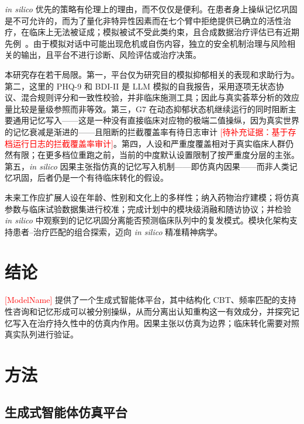 \documentclass[11pt,a4paper]{article}
\newcommand{\ph}[1]{\textcolor{red}{[#1]}}
\begin{document}
\emph{in silico} 优先的策略有伦理上的理由，而不仅仅是便利。在患者身上操纵记忆巩固是不可允许的，而为了量化非特异性因素而在七个臂中拒绝提供已确立的活性治疗，在临床上无法被证成；模拟被试不受此类约束，且合成数据治疗评估已有近期先例~\cite{yosef2025}。由于模拟对话中可能出现危机或自伤内容，独立的安全机制治理与风险相关的输出，且平台不进行诊断、风险评估或治疗决策。

本研究存在若干局限。第一，平台仅为研究目的模拟抑郁相关的表现和求助行为。第二，这里的 PHQ-9 和 BDI-II 是 LLM 模拟的自我报告，采用逐项无状态协议、混合规则评分和一致性校验，并非临床施测工具；因此与真实荟萃分析的效应量比较是量级参照而非等效。第三，G7 在动态抑郁状态机继续运行的同时阻断主要通用记忆写入——这是一种没有直接临床对应物的极端二值操纵，因为真实世界的记忆衰减是渐进的——且阻断的拦截覆盖率有待日志审计 \ph{待补充证据：基于存档运行日志的拦截覆盖率审计}。第四，人设和严重度覆盖相对于真实临床人群仍然有限；在更多档位重跑之前，当前的中度默认设置限制了按严重度分层的主张。第五，\emph{in silico} 因果主张指仿真的记忆写入机制——即仿真内因果——而非人类记忆巩固，后者仍是一个有待临床转化的假设。

未来工作应扩展人设在年龄、性别和文化上的多样性；纳入药物治疗建模；将仿真参数与临床试验数据集进行校准；完成计划中的模块级消融和随访协议；并检验 \emph{in silico} 中观察到的记忆巩固分离能否预测临床队列中的复发模式。模块化架构支持患者--治疗匹配的组合探索，迈向 \emph{in silico} 精准精神病学。

\section{结论}\label{sec:conclusions}

\ph{ModelName} 提供了一个生成式智能体平台，其中结构化 CBT、频率匹配的支持性咨询和记忆形成可以被分别操纵，从而分离出认知重构这一有效成分，并探究记忆写入在治疗持久性中的仿真内作用。因果主张以仿真为边界；临床转化需要对照真实队列进行验证。

\section{方法}\label{sec:methods}

\subsection*{生成式智能体仿真平台}
\end{document}
